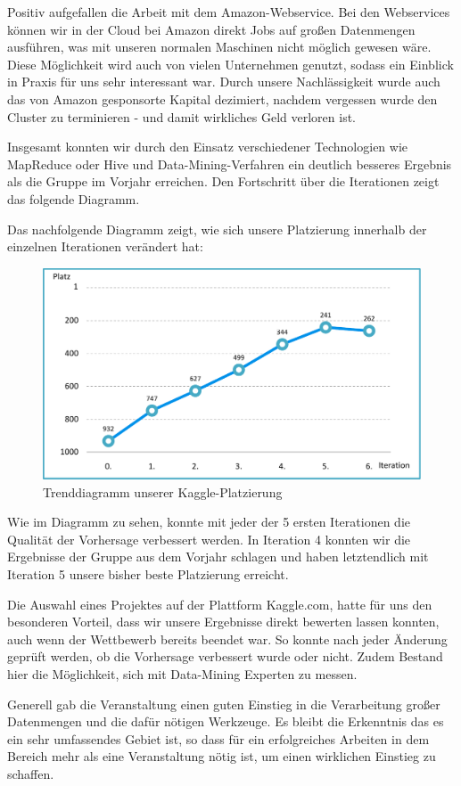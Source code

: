 Positiv aufgefallen die Arbeit mit dem Amazon-Webservice. Bei den Webservices können wir in der Cloud bei Amazon direkt Jobs auf großen Datenmengen ausführen, was mit unseren normalen Maschinen nicht möglich gewesen wäre. Diese Möglichkeit wird auch von vielen Unternehmen genutzt, sodass ein Einblick in Praxis für uns sehr interessant war. Durch unsere Nachlässigkeit wurde auch das von Amazon gesponsorte Kapital dezimiert, nachdem vergessen wurde den Cluster zu terminieren - und damit wirkliches Geld verloren ist.

Insgesamt konnten wir durch den Einsatz verschiedener Technologien wie MapReduce oder Hive und Data-Mining-Verfahren ein deutlich besseres Ergebnis als die Gruppe im Vorjahr erreichen. Den Fortschritt über die Iterationen zeigt das folgende Diagramm.

Das nachfolgende Diagramm zeigt, wie sich unsere Platzierung innerhalb der einzelnen Iterationen verändert hat:

\begin{figure}[H]
\centering
\includegraphics[width=0.85\linewidth]{Bilder/Trenddiagramm_Platzierungen}
\caption{Trenddiagramm unserer Kaggle-Platzierung}
\label{fig:Trenddiagramm_Platzierungen}
\end{figure}

Wie im Diagramm zu sehen, konnte mit jeder der 5 ersten Iterationen die Qualität der Vorhersage verbessert werden. In Iteration 4 konnten wir die Ergebnisse der Gruppe aus dem Vorjahr schlagen und haben letztendlich mit Iteration 5 unsere bisher beste Platzierung erreicht.

Die Auswahl eines Projektes auf der Plattform Kaggle.com, hatte für uns den besonderen Vorteil, dass wir unsere Ergebnisse direkt bewerten lassen konnten, auch wenn der Wettbewerb bereits beendet war. So konnte nach jeder Änderung geprüft werden, ob die Vorhersage verbessert wurde oder nicht. Zudem Bestand hier die Möglichkeit, sich mit Data-Mining Experten zu messen.

Generell gab die Veranstaltung einen guten Einstieg in die Verarbeitung großer Datenmengen und die dafür nötigen Werkzeuge. Es bleibt die Erkenntnis das es ein sehr umfassendes Gebiet ist, so dass für ein erfolgreiches Arbeiten in dem Bereich mehr als eine Veranstaltung nötig ist, um einen wirklichen Einstieg zu schaffen.